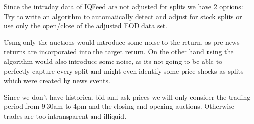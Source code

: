 \documentclass[12pt,a4paper]{article}
\begin{document}
	Since the intraday data of IQFeed are not adjusted for splits we have 2 options:
	Try to write an algorithm to automatically detect and adjust for stock splits or
	use only the open/close of the adjusted EOD data set.
	
	Using only the auctions would introduce some noise to the return, as pre-news returns are incorporated into the
	target return.
	On the other hand using the algorithm would also introduce some noise, as its not going to be able to perfectly capture every split and might even identify some price shocks as splits which were created by news events.
	
	Since we don't have historical bid and ask prices we will only consider the trading period from 9:30am to 4pm and the closing and opening auctions.
	Otherwise trades are too intransparent and illiquid.
	
	
	
	
	
	
	
	
\end{document}
